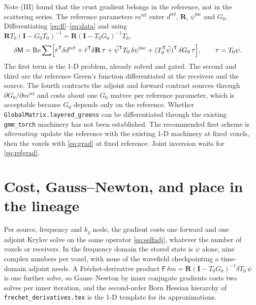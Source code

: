 \documentclass[11pt,a4paper]{article}
\newcommand{\Tz}{T_0}
\newcommand{\Gz}{G_0}
\newcommand{\bR}{\mathbf{R}}
\newcommand{\bI}{\mathbf{I}}
\newcommand{\T}{\mathsf{T}}
\begin{document}
Note (III) found that the crust gradient belongs in the reference, not in the scattering series.
The reference parameters $m^{\mathrm{ref}}$ enter $d^{\mathrm{ref}}$, $\bR$, $\psi^{\mathrm{inc}}$
and $\Gz$. Differentiating \eqref{eq:fl}--\eqref{eq:data} and using
$\bR\Tz(\bI-\Gz\Tz)^{-1} = \bR(\bI-\Tz\Gz)^{-1}\Tz$,
\begin{equation}\label{eq:refgrad}
  \delta\mathsf{M} = \operatorname{Re}\sum \Bigl[
    \bar r^{\T}\delta d^{\mathrm{ref}}
    + \bar r^{\T}\delta\bR\,\tau
    + \tilde\psi^{\T}\Tz\,\delta\psi^{\mathrm{inc}}
    + (\Tz^{\T}\tilde\psi)^{\T}\,\delta\Gz\,\tau
  \Bigr],
  \qquad \tau = \Tz\psi .
\end{equation}
The first term is the 1-D problem, already solved and gated. The second and third are the
reference Green's function differentiated at the receivers and the source. The fourth contracts
the adjoint and forward contrast sources through $\partial\Gz/\partial m^{\mathrm{ref}}$ and costs
about one $\Gz$ matvec per reference parameter, which is acceptable because $\Gz$ depends only on
the reference. Whether \nolinkurl{GlobalMatrix.layered_greens} can be differentiated through the
existing \nolinkurl{gmm_torch} machinery has not been established. The recommended first scheme is
\emph{alternating}: update the reference with the existing 1-D machinery at fixed voxels, then the
voxels with \eqref{eq:grad} at fixed reference. Joint inversion waits for \eqref{eq:refgrad}.

\section{Cost, Gauss--Newton, and place in the lineage}\label{sec:cost}

Per source, frequency and $k_y$ node, the gradient costs one forward and one adjoint Krylov solve
on the same operator \eqref{eq:selfadj}, whatever the number of voxels or receivers. In the
frequency domain the stored state is $\psi$ alone, nine complex numbers per voxel, with none of the
wavefield checkpointing a time-domain adjoint needs. A Fr\'echet-derivative product
$\mathsf{F}\,\delta m = \bR(\bI-\Tz\Gz)^{-1}\delta\Tz\,\psi$ is one further solve, so Gauss--Newton by
inner conjugate gradients costs two solves per inner iteration, and the second-order Born Hessian
hierarchy of \nolinkurl{frechet_derivatives.tex} is the 1-D template for its approximations.
\end{document}
